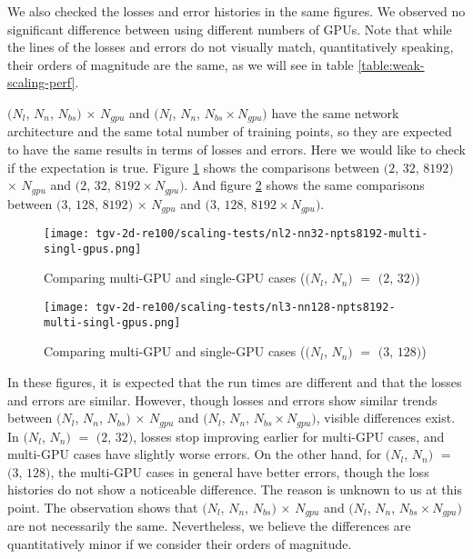 We also checked the losses and error histories in the same figures.
We observed no significant difference between using different numbers of GPUs.
Note that while the lines of the losses and errors do not visually match, quantitatively speaking, their orders of magnitude are the same, as we will see in table \ref{table:weak-scaling-perf}. 

$(N_l$, $N_n$, $N_{bs})$ $\times$ $N_{gpu}$ and $(N_l$, $N_n$, $N_{bs}\times N_{gpu})$ have the same network architecture and the same total number of training points, so they are expected to have the same results in terms of losses and errors.
Here we would like to check if the expectation is true.
Figure \ref{fig:nl2-nn32-npts8192-multi-singl-gpus} shows the comparisons between $(2$, $32$, $8192)$ $\times$ $N_{gpu}$ and $(2$, $32$, $8192\times N_{gpu})$.
And figure \ref{fig:nl3-nn128-npts8192-multi-singl-gpus} shows the same comparisons between $(3$, $128$, $8192)$ $\times$ $N_{gpu}$ and $(3$, $128$, $8192\times N_{gpu})$.

\begin{figure}[hbt!]
    \centering%
    \texttt{[image: tgv-2d-re100/scaling-tests/nl2-nn32-npts8192-multi-singl-gpus.png]}
    \caption[%
        Comparing multi-GPU and single-GPU cases ($(N_l$, $N_n)$ $=$ $(2$, $32)$)%
    ]{%
        Comparing multi-GPU and single-GPU cases ($(N_l$, $N_n)$ $=$ $(2$, $32)$)%
    }\label{fig:nl2-nn32-npts8192-multi-singl-gpus}
\end{figure}

\begin{figure}[hbt!]
    \centering%
    \texttt{[image: tgv-2d-re100/scaling-tests/nl3-nn128-npts8192-multi-singl-gpus.png]}
    \caption[%
        Comparing multi-GPU and single-GPU cases ($(N_l$, $N_n)$ $=$ $(3$, $128)$)%
    ]{%
        Comparing multi-GPU and single-GPU cases ($(N_l$, $N_n)$ $=$ $(3$, $128)$)%
    }\label{fig:nl3-nn128-npts8192-multi-singl-gpus}
\end{figure}

In these figures, it is expected that the run times are different and that the losses and errors are similar.
However, though losses and errors show similar trends between $(N_l$, $N_n$, $N_{bs})$ $\times$ $N_{gpu}$ and $(N_l$, $N_n$, $N_{bs}\times N_{gpu})$, visible differences exist.
In $(N_l$, $N_n)$ $=$ $(2$, $32)$, losses stop improving earlier for multi-GPU cases, and multi-GPU cases have slightly worse errors.
On the other hand, for $(N_l$, $N_n)$ $=$ $(3$, $128)$, the multi-GPU cases in general have better errors, though the loss histories do not show a noticeable difference.
The reason is unknown to us at this point.
The observation shows that $(N_l$, $N_n$, $N_{bs})$ $\times$ $N_{gpu}$ and $(N_l$, $N_n$, $N_{bs}\times N_{gpu})$ are not necessarily the same.
Nevertheless, we believe the differences are quantitatively minor if we consider their orders of magnitude.


